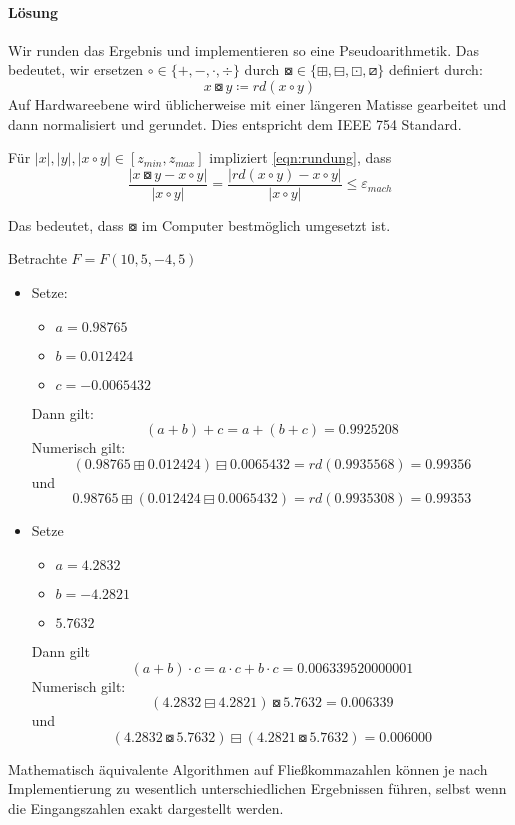 \paragraph{Lösung}
Wir runden das Ergebnis und implementieren so eine Pseudoarithmetik.
Das bedeutet, wir ersetzen $\circ \in  \{+,-,\cdot, \div\}$ durch $\boxcircle \in \{\boxplus, \boxminus, \boxdot, \boxslash\}$ definiert durch:
\begin{equation}\label{eqn:rundung}
x \boxcircle y \coloneqq rd (x \circ y)
\end{equation}
Auf Hardwareebene wird üblicherweise mit einer längeren Matisse gearbeitet und dann normalisiert und gerundet. Dies entspricht dem IEEE 754 Standard.
\begin{remark}
Für $|x|,|y|, |x \circ y| \in [z_{min},z_{max}]$ impliziert \eqref{eqn:rundung}, dass
\[
	\frac{|x \boxcircle y - x \circ y|}{|x \circ y|}= \frac{ | rd(x \circ y ) - x \circ y |}{|x \circ y|} \le \varepsilon_{mach}
\]

Das bedeutet, dass $\boxcircle$ im Computer bestmöglich umgesetzt ist.
\end{remark}
\begin{example}
Betrachte $F=F(10,5,-4,5)$ \\
\begin{itemize}
	\item Setze:
\begin{itemize}
	\item $a=0.98765$
	\item $b=0.012424$
	\item $c=-0.0065432$
\end{itemize}
Dann gilt:
\[
	(a+b)+c=a+(b+c)=0.9925208
\]
Numerisch gilt:
\[
(0.98765 \boxplus 0.012424)\boxminus 0.0065432= rd(0.9935568)=0.99356
\]
und
\[
0.98765 \boxplus (0.012424\boxminus 0.0065432)=rd(0.9935308)=0.99353
\]
\item Setze
	\begin{itemize}
		\item $a=4.2832$
		\item $b=-4.2821$
		\item $5.7632$
	\end{itemize}
Dann gilt
\[
(a+b)\cdot c = a \cdot c + b \cdot c = 0.006339520000001
\]
Numerisch gilt:
\[
	(4.2832 \boxminus 4.2821) \boxcircle 5.7632 = 0.006339
\]
und
\[
	(4.2832 \boxcircle 5.7632) \boxminus (4.2821 \boxcircle 5.7632) = 0.006000
\]
\end{itemize}
\end{example}
\begin{remark}
Mathematisch äquivalente Algorithmen auf Fließkommazahlen können je nach Implementierung zu wesentlich unterschiedlichen Ergebnissen führen, selbst wenn die Eingangszahlen exakt dargestellt werden.
\end{remark}
